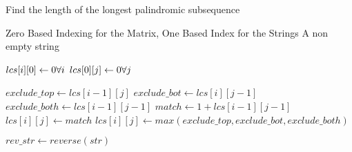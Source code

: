\documentclass[12pt]{article}
\begin{document}
\begin{algorithm}

  \caption{Find the length of the longest palindromic subsequence}

  \begin{algorithmic}[1]
    \Ensure Zero Based Indexing for the Matrix, One Based Index for the Strings
    \Require A non empty string
    \Statex

        
        \State $lcs[i][0] \gets 0 \hfill \forall i$ 
        \State $lcs[0][j] \gets 0 \hfill \forall j$ 

                \State $exclude\_top \gets lcs[i-1][j]$
                \State $exclude\_bot \gets lcs[i][j-1]$
                \State $exclude\_both \gets lcs[i-1][j-1]$
                \State $match \gets 1 + lcs[i-1][j-1] $
                    \State $lcs[i][j] \gets match$
                \Else 
                    \State $lcs[i][j] \gets max(exclude\_top, exclude\_bot, exclude\_both) $
                \EndIf
            \EndFor
        \EndFor
        
        \State {}
    \EndFunction
    \Statex
    
        \State $rev\_str \gets reverse(str)$
        \State {} 
    \EndFunction
  \end{algorithmic}

\end{algorithm}
\end{document}
